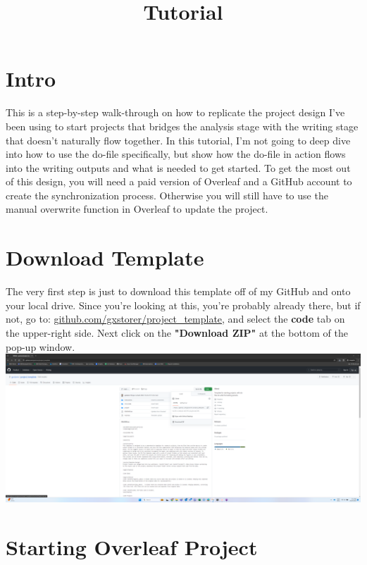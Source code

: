 \documentclass[12pt]{article}
\title{Tutorial}
\begin{document}
\maketitle

\section{Intro}

This is a step-by-step walk-through on how to replicate the project design I've been using to start projects that bridges the analysis stage with the writing stage that doesn't naturally flow together. In this tutorial, I'm not going to deep dive into how to use the do-file specifically, but show how the do-file in action flows into the writing outputs and what is needed to get started. To get the most out of this design, you will need a paid version of Overleaf and a GitHub account to create the synchronization process. Otherwise you will still have to use the manual overwrite function in Overleaf to update the project.

\section{Download Template}

The very first step is just to download this template off of my GitHub and onto your local drive. Since you're looking at this, you're probably already there, but if not, go to: \href{https://github.com/gxstorer/project_template}{\underline{github.com/gxstorer/project\_template}}, and select the \textbf{code} tab on the upper-right side. Next click on the \textbf{"Download ZIP"} at the bottom of the pop-up window. \\


\includegraphics[width=1\textwidth]{Instructions/project_template_screenshots/project_template_001.png} \\

\section{Starting Overleaf Project}
\end{document}
